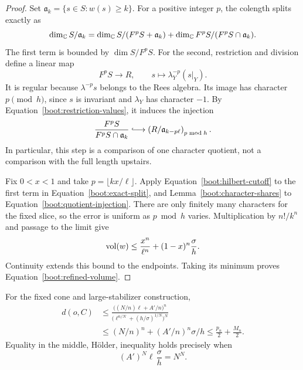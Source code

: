 \begin{proof}
Set $\mathfrak a_k=\{s\in S:w(s)\geq k\}$.  For a positive
integer $p$, the colength splits exactly as
\begin{equation}
 \label{boot:exact-split}
 \dim_\mathbb C S/\mathfrak a_k
 =\dim_\mathbb C S/(F^pS+\mathfrak a_k)
  +\dim_\mathbb C F^pS/(F^pS\cap\mathfrak a_k).
\end{equation}
The first term is bounded by $\dim S/F^pS$.  For the second,
restriction and division define a linear map
\[
 F^pS\longrightarrow R,
 \qquad s\longmapsto
            \lambda_Y^{-p}(s|_Y).
\]
It is regular because $\lambda^{-p}s$ belongs to the Rees
algebra.  Its image has character $p\pmod h$, since $s$ is
invariant and $\lambda_Y$ has character $-1$.  By
Equation~\eqref{boot:restriction-values}, it induces the
injection
\begin{equation}
 \label{boot:quotient-injection}
 \frac{F^pS}{F^pS\cap\mathfrak a_k}
 \lhook\joinrel\longrightarrow
 \left(R/\fa_{k-p\ell}\right)_{p\bmod h}.
\end{equation}
In particular, this step is a comparison of one character
quotient, not a comparison with the full length upstairs.

Fix $0<x<1$ and take $p=\lfloor kx/\ell\rfloor$.  Apply
Equation~\eqref{boot:hilbert-cutoff} to the first term in
Equation~\eqref{boot:exact-split}, and
Lemma~\ref{boot:character-shares} to
Equation~\eqref{boot:quotient-injection}.  There are only
finitely many characters for the fixed slice, so the error
is uniform as $p\bmod h$ varies.  Multiplication by $n!/k^n$
and passage to the limit give
\[
 \operatorname{vol}(w)\leq \frac{x^n}{\ell^n}
                  +(1-x)^n\frac{\sigma}{h}.
\]
Continuity extends this bound to the endpoints.  Taking its
minimum proves Equation~\eqref{boot:refined-volume}.
\end{proof}

\begin{lemma}[Optimization]
\label{boot:holder}
For the fixed cone and large-stabilizer construction,
\begin{align}
 d(o,C)
 &\leq
 \frac{\bigl((N/n)\ell+A'/n\bigr)^n}
 {\bigl(\ell^{n/N}+(h/\sigma)^{1/N}\bigr)^N}
 \label{boot:optimized}\\
 &\leq (N/n)^n+(A'/n)^n\sigma/h
 \leq \frac{p_n}{2}+\frac{M_n}{2}.
 \label{boot:bootstrap-inequality}
\end{align}
Equality in the middle, Hölder, inequality holds precisely when
\begin{equation}
 \label{boot:holder-equality}
 (A')^N\ell\,\frac{\sigma}{h}=N^N.
\end{equation}
\end{lemma}

